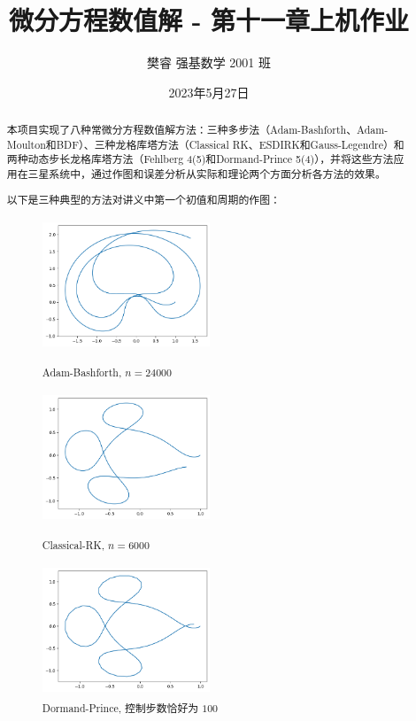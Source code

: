 \documentclass{ctexart}
\title{微分方程数值解 - 第十一章上机作业}
\author{樊睿 强基数学 2001 班}
\date{2023年5月27日}
\begin{document}
\maketitle

\begin{abstract}
	本项目实现了八种常微分方程数值解方法：三种多步法（Adam-Bashforth、Adam-Moulton和BDF）、三种龙格库塔方法（Classical RK、ESDIRK和Gauss-Legendre）和两种动态步长龙格库塔方法（Fehlberg 4(5)和Dormand-Prince 5(4)），并将这些方法应用在三星系统中，通过作图和误差分析从实际和理论两个方面分析各方法的效果。

	以下是三种典型的方法对讲义中第一个初值和周期的作图：

	\begin{figure}[htbp]
		\begin{minipage}{5cm}
			\centering
			\includegraphics[width = 5cm, height = 4cm]{01.png}
			\caption{Adam-Bashforth, $n=24000$}
			\label{1}
		\end{minipage}
		\begin{minipage}{5cm}
			\centering
			\includegraphics[width = 5cm, height = 4cm]{02.png}
			\caption{Classical-RK, $n=6000$}
			\label{2}
		\end{minipage}
		\begin{minipage}{5cm}
			\centering
			\includegraphics[width = 5cm, height = 4cm]{03.png}
			\caption{Dormand-Prince, 控制步数恰好为 $100$}
			\label{3}
		\end{minipage}
	\end{figure}
\end{abstract}
\end{document}
